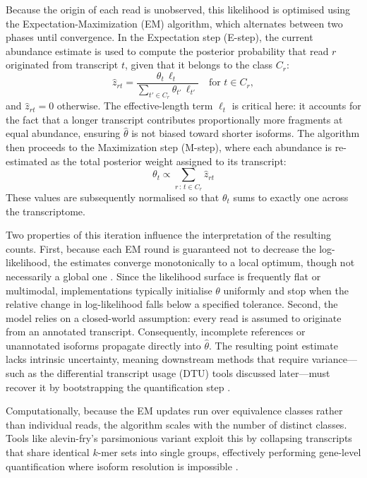 Because the origin of each read is unobserved, this likelihood is optimised using the Expectation-Maximization (EM) algorithm, which alternates between two phases until convergence. In the Expectation step (E-step), the current abundance estimate is used to compute the posterior probability that read $r$ originated from transcript $t$, given that it belongs to the class $C_r$:
$$ \hat{z}_{rt} = \frac{\theta_t \, \ell_t}{\sum_{t' \in C_r} \theta_{t'} \, \ell_{t'}} \quad \text{for } t \in C_r, $$
and $\hat{z}_{rt} = 0$ otherwise. The effective-length term $\ell_t$ is critical here: it accounts for the fact that a longer transcript contributes proportionally more fragments at equal abundance, ensuring $\hat{\theta}$ is not biased toward shorter isoforms. The algorithm then proceeds to the Maximization step (M-step), where each abundance is re-estimated as the total posterior weight assigned to its transcript:
$$ \theta_t \propto \sum_{r \,:\, t \in C_r} \hat{z}_{rt} $$
These values are subsequently normalised so that $\theta_t$ sums to exactly one across the transcriptome.

Two properties of this iteration influence the interpretation of the resulting counts. First, because each EM round is guaranteed not to decrease the log-likelihood, the estimates converge monotonically to a local optimum, though not necessarily a global one \cite{dempster1977maximum}. Since the likelihood surface is frequently flat or multimodal, implementations typically initialise $\theta$ uniformly and stop when the relative change in log-likelihood falls below a specified tolerance. Second, the model relies on a closed-world assumption: every read is assumed to originate from an annotated transcript. Consequently, incomplete references or unannotated isoforms propagate directly into $\hat{\theta}$. The resulting point estimate lacks intrinsic uncertainty, meaning downstream methods that require variance---such as the differential transcript usage (DTU) tools discussed later---must recover it by bootstrapping the quantification step \cite{love2018swimming}.

Computationally, because the EM updates run over equivalence classes rather than individual reads, the algorithm scales with the number of distinct classes. Tools like alevin-fry's parsimonious variant exploit this by collapsing transcripts that share identical $k$-mer sets into single groups, effectively performing gene-level quantification where isoform resolution is impossible \cite{he2022alevin}.

